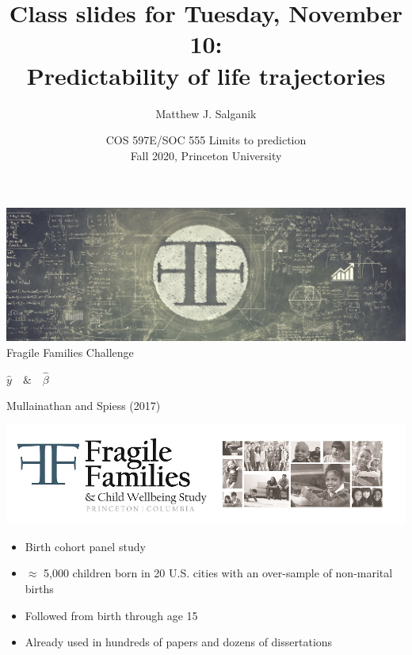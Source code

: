 \documentclass[aspectratio=169]{beamer}
\title[]{Class slides for Tuesday, November 10:\\Predictability of life trajectories}
\author[]{Matthew J. Salganik}
\institute[]{}
\date[]{COS 597E/SOC 555 Limits to prediction\\Fall 2020, Princeton University}
\begin{document}
\frame{\titlepage}
\begin{frame}

\begin{center}
\includegraphics[width=\textwidth]{figures/ffc_masthead}
\Large{Fragile Families Challenge}
\end{center}

\end{frame}
\begin{frame}

\begin{center}
\Huge{
$ \hat{y} \quad \& \quad \hat{\beta}$
}
\end{center}

\vfill
\tiny{Mullainathan and Spiess (2017)}
\end{frame}
\begin{frame}

\begin{center}
\includegraphics[width=\textwidth]{figures/ff_logo}
\end{center}

\begin{itemize}
\item Birth cohort panel study
\item $\approx$ 5,000 children born in 20 U.S. cities with an over-sample of non-marital births
\item Followed from birth through age 15
\item Already used in hundreds of papers and dozens of dissertations
\end{itemize}

\end{frame}
\end{document}
